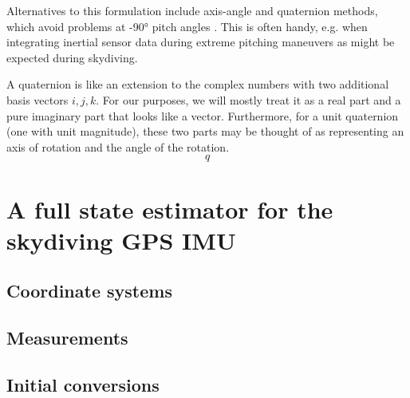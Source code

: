 \documentclass{amsart}
\begin{document}
Alternatives to this formulation include axis-angle and quaternion methods, which avoid problems at \ang{+-90} pitch angles \cite{Phillips:2004}.  This is often handy, e.g. when integrating inertial sensor data during extreme pitching maneuvers as might be expected during skydiving.

A quaternion is like an extension to the complex numbers with two additional basis vectors $i, j, k$. For our purposes, we will mostly treat it as a real part and a pure imaginary part that looks like a vector.  Furthermore, for a unit quaternion (one with unit magnitude), these two parts may be thought of as representing an axis of rotation and the angle of the rotation.  
\begin{equation}
q
\end{equation}


\section{A full state estimator for the skydiving GPS IMU}
\subsection{Coordinate systems}
\subsection{Measurements}
\subsection{Initial conversions}
\end{document}

